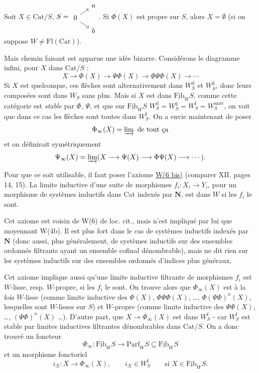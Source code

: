 \documentclass[11pt]{article}
\newcommand{\msp}[1]{\marginpar{\footnotesize [#1]}}
\newcommand{\und}[1]{\underline{\mathrm{#1}}}
\begin{document}
\noindent\llap{$|||$\quad}Soit $X \in \mathrm{Cat}/S$, $S = \begin{tikzcd}[row sep=tiny, column sep=small] & a \\ 0 \arrow[ur] \arrow[dr] & \\ & b \end{tikzcd}$. Si $\Phi(X)$ est propre sur $S$, alors $X = \emptyset$ (si on suppose $W \neq \mathrm{Fl}(\mathrm{Cat})$).

Mais chemin faisant est apparue une idée bizarre. Considérons le diagramme infini, pour $X$ dans $\mathrm{Cat}/S$ :
\[
X \longrightarrow \Phi(X) \longrightarrow \Psi\Phi(X) \longrightarrow \Phi\Psi\Phi(X) \longrightarrow \cdots
\]
Si $X$ est quelconque, ces flèches sont alternativement dans $W_S^{\mathrm{d}}$ et $W_S^{\mathrm{g}}$, donc leurs composées sont dans $W_S$ sans plus. Mais si $X$ est dans $\und{Fib}_W S$, comme cette catégorie est \textit{stable} par $\Phi$, $\Psi$, et que sur $\und{Fib}_W S$ $W_S^{\mathrm{d}} = W_S^{\mathrm{g}} = W_S^{\mathrm{f}} = W_S^{\mathrm{univ}}$, on voit que dans ce cas les flèches sont toutes dans $W_S^{\mathrm{f}}$. On a envie maintenant de poser
\[
\Phi_\infty(X) = \varinjlim \text{ de tout ça}
\]
\msp{page 193}
et on définirait symétriquement
\[
\Psi_\infty(X) = \varinjlim (X \longrightarrow \Psi(X) \longrightarrow \Phi\Psi(X) \longrightarrow \cdots).
\]

Pour que ce soit utilisable, il faut poser l'axiome \underline{W(6 bis)} (comparer XII, pages 14, 15). La limite inductive d'une suite de morphismes $f_i : X_i \longrightarrow Y_i$, pour un morphisme de systèmes inductifs dans Cat indexés par $\mathbf{N}$, est dans $W$ si les $f_i$ le sont.

Cet axiome est voisin de W(6) de loc. cit., mais n'est impliqué par lui que moyennant W(4b). Il est plus fort dans le cas de systèmes inductifs indexés par $\mathbf{N}$ (donc aussi, plus généralement, de systèmes inductifs sur des ensembles ordonnés filtrants ayant un ensemble cofinal dénombrable), mais ne dit rien sur les systèmes inductifs sur des ensembles ordonnés d'indices plus généraux.

Cet axiome implique aussi qu'une limite inductive filtrante de morphismes $f_i$ est $W$-lisse, resp. $W$-propre, si les $f_i$ le sont. On trouve alors que $\Phi_\infty(X)$ est à la fois $W$-lisse (comme limite inductive des $\Phi(X)$, $\Phi\Psi\Phi(X)$, \ldots, $\Phi(\Psi\Phi)^n(X)$, lesquelles sont $W$-lisses sur $S$) et $W$-propre (comme limite inductive des $\Psi\Phi(X)$, \ldots, $(\Psi\Phi)^n(X)$ \ldots). D'autre part, que $X \longrightarrow \Phi_\infty(X)$ est dans $W_S^{\mathrm{f}}$ - car $W_S^{\mathrm{f}}$ est stable par limites inductives filtrantes dénombrables dans $\mathrm{Cat}/S$. On a donc trouvé un foncteur
\msp{page 194}
\[
\Phi_\infty : \und{Fib}_W S \longrightarrow \und{Parf}_W S \subseteq \und{Fib}_W S
\]
et un morphisme fonctoriel
\[
i_X : X \longrightarrow \Phi_\infty(X), \qquad \boxed{i_X \in W_S^{\mathrm{f}}} \qquad \text{si } X \in \und{Fib}_W S.
\]
\end{document}
